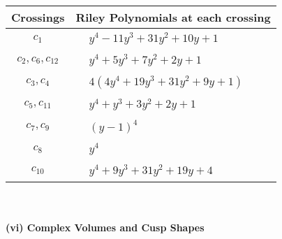 \documentclass[1p]{elsarticle_modified}
\theoremstyle{definition}
\begin{document}
\begin{tabular}{m{50pt}|m{274pt}}
Crossings & \hspace{64pt}Riley Polynomials at each crossing \\
\hline $$\begin{aligned}c_{1}\end{aligned}$$&$\begin{aligned}
&y^4-11 y^3+31 y^2+10 y+1
\end{aligned}$\\
\hline $$\begin{aligned}c_{2},c_{6},c_{12}\end{aligned}$$&$\begin{aligned}
&y^4+5 y^3+7 y^2+2 y+1
\end{aligned}$\\
\hline $$\begin{aligned}c_{3},c_{4}\end{aligned}$$&$\begin{aligned}
&4(4 y^4+19 y^3+31 y^2+9 y+1)
\end{aligned}$\\
\hline $$\begin{aligned}c_{5},c_{11}\end{aligned}$$&$\begin{aligned}
&y^4+y^3+3 y^2+2 y+1
\end{aligned}$\\
\hline $$\begin{aligned}c_{7},c_{9}\end{aligned}$$&$\begin{aligned}
&(y-1)^4
\end{aligned}$\\
\hline $$\begin{aligned}c_{8}\end{aligned}$$&$\begin{aligned}
&y^4
\end{aligned}$\\
\hline $$\begin{aligned}c_{10}\end{aligned}$$&$\begin{aligned}
&y^4+9 y^3+31 y^2+19 y+4
\end{aligned}$\\
\hline
\end{tabular}\\~\\
\newpage\flushleft \textbf{(vi) Complex Volumes and Cusp Shapes}
\end{document}
